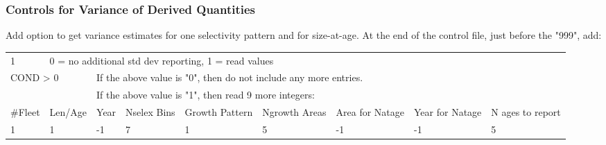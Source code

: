 \subsubsection{Controls for Variance of Derived Quantities}
Add option to get variance estimates for one selectivity pattern and for size-at-age.  At the end of the control file, just before the "999", add:
\begin{center}
	\begin{longtable}{p{1cm} p{1.2cm} p{1.2cm} p{1.2cm} p{1.2cm} p{1.2cm} p{1.5cm} p{1.5cm} p{1.8cm}}
		\hline
		1 & \multicolumn{8}{l}{0 = no additional std dev reporting, 1 = read values}\\
		\multicolumn{2}{l}{COND > 0} & \multicolumn{7}{l}{If the above value is "0", then do not include any more entries.}\\
		  & & \multicolumn{7}{l}{If the above value is "1", then read 9 more integers:}\\
		\#Fleet & Len/Age & Year & Nselex Bins & Growth Pattern & Ngrowth Areas & Area for Natage & Year for Natage & N ages to report\\
		\hline
		1 & 1 & -1 & 7 & 1 & 5 & -1 & -1 & 5\\
		\hline
	\end{longtable}
\end{center}

